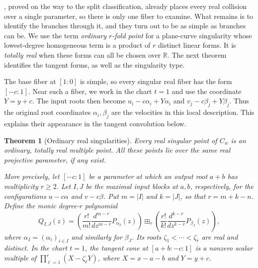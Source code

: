 \documentclass[12pt,reqno]{amsart}
\newtheorem{theorem}{Theorem}[section]
\theoremstyle{definition}
\theoremstyle{remark}
\newcommand{\R}{\mathbb R}
\begin{document}
, proved on the way to the split
classification, already places every real collision over a single
parameter, so there is only one fiber to examine.  What remains is to
identify the branches through it, and they turn out to be as simple as
branches can be. 
We use the term \emph{ordinary \(r\)-fold point} for a plane-curve
singularity whose lowest-degree homogeneous term is a product of \(r\)
distinct linear forms.  It is \emph{totally real} when these forms can all
be chosen over \(\R\).  The next theorem identifies the tangent forms,
as well as the singularity type.

The base fiber at \([1:0]\) is simple, so every singular real fiber has the form \([-c:1]\). Near such a fiber, we work in the chart \(t=1\) and use the coordinate \(Y=y+c\). The input roots then become \(u_i-c\alpha_i+Y\alpha_i\) and \(v_j-c\beta_j+Y\beta_j\). Thus the original root coordinates \(\alpha_i,\beta_j\) are the velocities in this local description. This explains their appearance in the tangent convolution below.

\begin{theorem}[Ordinary real singularities]
\label{thm:ordinary-real-singularities}
Every real singular point of \(C_w\) is an ordinary, totally real
multiple point.  All these points lie over the same real projective
parameter, if any exist.

More precisely, let \([-c:1]\) be a parameter at which an output root
\(a+b\) has multiplicity \(r\geq2\).  Let \(I,J\) be the maximal
input blocks at \(a,b\), respectively, for the configurations
\(u-c\alpha\) and \(v-c\beta\).  Put \(m=|I|\) and \(k=|J|\),
so that \(r=m+k-n\).  Define the monic degree-\(r\) polynomial
\begin{equation}\label{eq:curve-collision-tangent-polynomial}
 Q_{I,J}(z)=
 \left(\frac{r!}{m!}\frac{d^{m-r}}{dz^{m-r}}P_{\alpha_I}(z)\right)
 \boxplus_r
 \left(\frac{r!}{k!}\frac{d^{k-r}}{dz^{k-r}}P_{\beta_J}(z)\right),
\end{equation}
where \(\alpha_I=(\alpha_i)_{i\in I}\) and similarly for
\(\beta_J\).  Its roots \(\zeta_1<\cdots<\zeta_r\) are real and
distinct.  In the chart \(t=1\), the tangent cone at
\([a+b:-c:1]\) is a nonzero scalar multiple of
\(\prod_{\ell=1}^r(X-\zeta_\ell Y)\), where
\(X=x-a-b\) and \(Y=y+c\).
\end{theorem}
\end{document}
